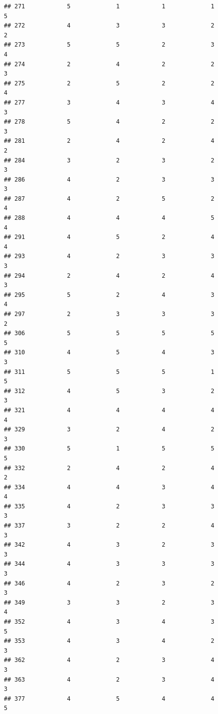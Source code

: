 \documentclass[
]{article}
\begin{document}
\begin{verbatim}
## 271            5             1            1             1          5
## 272            4             3            3             2          2
## 273            5             5            2             3          4
## 274            2             4            2             2          3
## 275            2             5            2             2          4
## 277            3             4            3             4          3
## 278            5             4            2             2          3
## 281            2             4            2             4          2
## 284            3             2            3             2          3
## 286            4             2            3             3          3
## 287            4             2            5             2          4
## 288            4             4            4             5          4
## 291            4             5            2             4          4
## 293            4             2            3             3          3
## 294            2             4            2             4          3
## 295            5             2            4             3          4
## 297            2             3            3             3          2
## 306            5             5            5             5          5
## 310            4             5            4             3          3
## 311            5             5            5             1          5
## 312            4             5            3             2          3
## 321            4             4            4             4          4
## 329            3             2            4             2          3
## 330            5             1            5             5          5
## 332            2             4            2             4          2
## 334            4             4            3             4          4
## 335            4             2            3             3          3
## 337            3             2            2             4          3
## 342            4             3            2             3          3
## 344            4             3            3             3          3
## 346            4             2            3             2          3
## 349            3             3            2             3          4
## 352            4             3            4             3          5
## 353            4             3            4             2          3
## 362            4             2            3             4          3
## 363            4             2            3             4          3
## 377            4             5            4             4          5

\end{verbatim}
\end{document}

